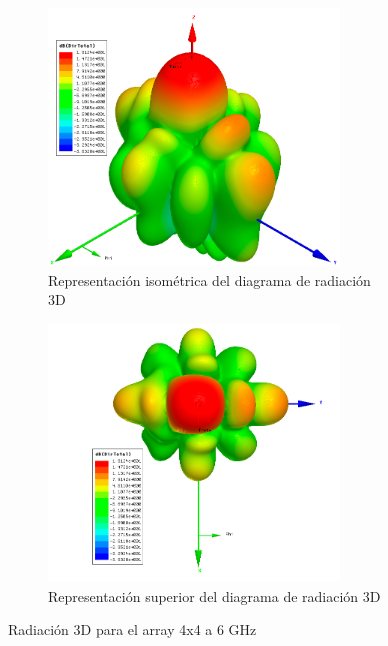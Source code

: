 \begin{figure}[H]
     \centering
     \begin{subfigure}[b]{0.7\textwidth}
         \centering
         \includegraphics[width=0.85\textwidth]{archivos/analisis/4x42/6}
         \caption{Representación isométrica del diagrama de radiación 3D}
         \label{fig:3d14x42}
     \end{subfigure}
     \hfill
     \begin{subfigure}[b]{0.7\textwidth}
         \centering
         \includegraphics[width=0.85\textwidth]{archivos/analisis/4x42/7}
         \caption{Representación superior del diagrama de radiación 3D}
         \label{fig:3d24x42}
     \end{subfigure}
     \hfill
        \caption{Radiación 3D para el array 4x4 a 6 GHz}
        \label{fig:3d4x42}
\end{figure}


